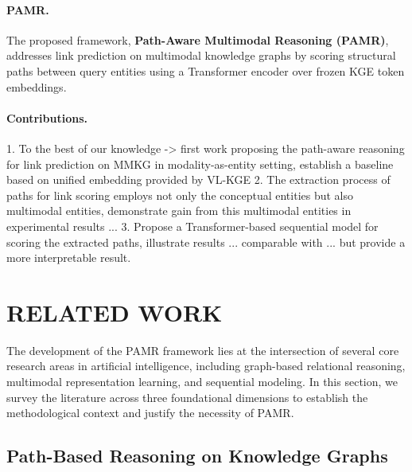\documentclass[runningheads]{llncs}
\begin{document}
\paragraph{PAMR.}
The proposed framework, \textbf{Path-Aware Multimodal Reasoning (PAMR)}, addresses
link prediction on multimodal knowledge graphs by scoring structural paths between
query entities using a Transformer encoder over frozen KGE token embeddings.

\paragraph{Contributions.}
1. To the best of our knowledge -> first work proposing the path-aware reasoning for link prediction on MMKG in modality-as-entity setting, establish a baseline based on unified embedding provided by VL-KGE
2. The extraction process of paths for link scoring employs not only the conceptual entities but also multimodal entities, demonstrate gain from this multimodal entities in experimental results ...
3. Propose a Transformer-based sequential model for scoring the extracted paths, illustrate results ... comparable with ... but provide a more interpretable result.

\section{\uppercase{Related Work}}
\label{sec:related-work}

The development of the PAMR framework lies at the intersection of several core research areas in artificial intelligence, including graph-based relational reasoning, multimodal representation learning, and sequential modeling. In this section, we survey the literature across three foundational dimensions to establish the methodological context and justify the necessity of PAMR.

\subsection{Path-Based Reasoning on Knowledge Graphs}
\label{sec:rw-path-reasoning}
\end{document}
